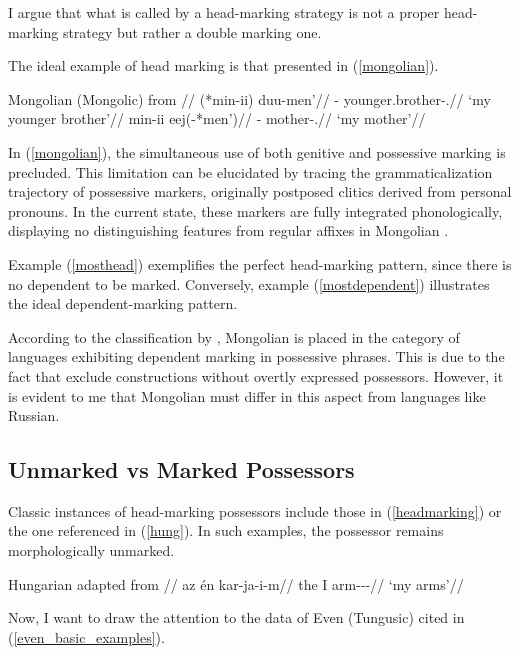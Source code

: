 I argue that what is called by \cite{nichols_locus_2013,lander2020head} a head-marking strategy is not a proper head-marking strategy but rather a double marking one.

The ideal example of head marking is that presented in (\ref{mongolian}).

\pex\label{mongolian}
\glpreamble Mongolian (Mongolic) from \cite{janhunen_mongolian_2012}//
\a\label{mosthead}
\begingl
\gla (*min-ii) duu-men'//
\glb \Fsg-\Gen{} younger.brother-\Poss.\First//
\glft `my younger brother'//
\endgl
\a
\begingl\label{mostdependent}
\gla min-ii eej(-*men')//
\glb \Fsg-\Gen{} mother-\Poss.\First//
\glft `my mother'//
\endgl
\xe

In (\ref{mongolian}), the simultaneous use of both genitive and possessive marking is precluded. This limitation can be elucidated by tracing the grammaticalization trajectory of possessive markers, originally postposed clitics derived from personal pronouns. In the current state, these markers are fully integrated phonologically, displaying no distinguishing features from regular affixes in Mongolian \citep[137]{janhunen_mongolian_2012}.

Example (\ref{mosthead}) exemplifies the perfect head-marking pattern, since there is no dependent to be marked. Conversely, example (\ref{mostdependent}) illustrates the ideal dependent-marking pattern.

According to the classification by \cite{nichols_locus_2013}, Mongolian is placed in the category of languages exhibiting dependent marking in possessive phrases. This is due to the fact that \cite{nichols_locus_2013} exclude constructions without overtly expressed possessors. However, it is evident to me that Mongolian must differ in this aspect from languages like Russian.

\subsection{Unmarked vs Marked Possessors}

Classic instances of head-marking possessors include those in (\ref{headmarking}) or the one referenced in (\ref{hung}). In such examples, the possessor remains morphologically unmarked.

\ex\label{hung}
\begingl
\glpreamble Hungarian adapted from \cite[263]{szabolcsi1981possessive}//
    \gla az én kar-ja-i-m//
    \glb the I arm-\Poss-\Pl-\Fsg//
    \glft `my arms'//
\endgl
\xe

Now, I want to draw the attention to the data of Even (Tungusic) cited in (\ref{even_basic_examples}).

